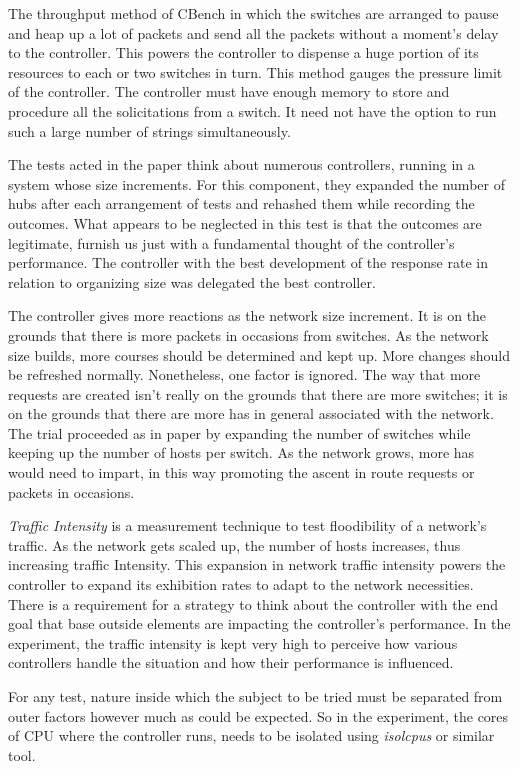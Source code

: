    The throughput method of CBench in which the switches are arranged to pause and heap up a lot of packets and send all the packets without a moment's delay to the controller. This powers the controller to dispense a huge portion of its resources to each or two switches in turn. This method gauges the pressure limit of the controller. The controller must have enough memory to store and procedure all the solicitations from a switch. It need not have the option to run such a large number of strings simultaneously.

        The tests acted in the paper \cite{dynamicrouting} think about numerous controllers, running in a system whose size increments. For this component, they expanded the number of hubs after each arrangement of tests and rehashed them while recording the outcomes. What appears to be neglected in this test is that the outcomes are legitimate, furnish us just with a fundamental thought of the controller's performance. The controller with the best development of the response rate in relation to organizing size was delegated the best controller.
        
    The controller gives more reactions as the network size increment. It is on the grounds that there is more packets in occasions from switches. As the network size builds, more courses should be determined and kept up. More changes should be refreshed normally. Nonetheless, one factor is ignored. The way that more requests are created isn't really on the grounds that there are more switches; it is on the grounds that there are more has in general associated with the network. The trial proceeded as in paper \cite{routingtie2017} by expanding the number of switches while keeping up the number of hosts per switch. As the network grows, more has would need to impart, in this way promoting the ascent in route requests or packets in occasions.
    
    \textit{Traffic Intensity} is a measurement technique to test floodibility of a network's traffic. As the network gets scaled up, the number of hosts increases, thus increasing traffic Intensity. This expansion in network traffic intensity powers the controller to expand its exhibition rates to adapt to the network necessities. There is a requirement for a strategy to think about the controller with the end goal that base outside elements are impacting the controller's performance. In the experiment, the traffic intensity is kept very high to perceive how various controllers handle the situation and how their performance is influenced.

    For any test, nature inside which the subject to be tried must be separated from outer factors however much as could be expected. So in the experiment, the cores of CPU where the controller runs, needs to be isolated using \textit{isolcpus} or similar tool.